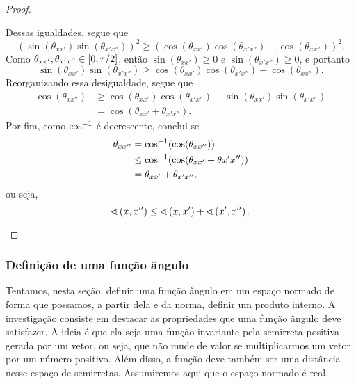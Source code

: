 \begin{proof}
\begin{enumerate}
	Dessas igualdades, segue que
		\begin{equation*}
		(\sin(\theta_{xx'}) \sin(\theta_{x'x''}))^2 \geq (\cos(\theta_{xx'})\cos(\theta_{x'x''}) - \cos(\theta_{xx''}))^2.
		\end{equation*}
	Como $\theta_{xx'}, \theta_{x'x''} \in \left[{0},{\tau/2}\right]$, então $\sin(\theta_{xx'}) \geq 0$ e $\sin(\theta_{x'x''}) \geq 0$, e portanto
		\begin{equation*}
		\sin(\theta_{xx'}) \sin(\theta_{x'x''}) \geq \cos(\theta_{xx'})\cos(\theta_{x'x''}) - \cos(\theta_{xx''}).
		\end{equation*}
	Reorganizando essa desigualdade, segue que
		\begin{align*}
		\cos(\theta_{xx''}) &\geq \cos(\theta_{xx'})\cos(\theta_{x'x''}) - \sin(\theta_{xx'}) \sin(\theta_{x'x''}) \\
			&= \cos(\theta_{xx'} + \theta_{x'x''}).
		\end{align*}
	Por fim, como $\cos^{-1}$ é decrescente, conclui-se
		\begin{align*}
		\theta_{xx''} &= \cos^{-1}(\cos(\theta_{xx''})) \\
			&\leq \cos^{-1}(\cos(\theta_{xx'} + \theta{x'x''})) \\
			&= \theta_{xx'} + \theta_{x'x''},
		\end{align*}
	ou seja,
		\begin{equation*}
		\sphericalangle\left({x},{x''}\right) \leq \sphericalangle\left({x},{x'}\right) + \sphericalangle\left({x'},{x''}\right).
		\qedhere
		\end{equation*}
	\end{enumerate}

\end{proof}



\subsubsection{Definição de uma função ângulo}

Tentamos, nesta seção, definir uma função ângulo em um espaço normado de forma que possamos, a partir dela e da norma, definir um produto interno. A investigação consiste em destacar as propriedades que uma função ângulo deve satisfazer. A ideia é que ela seja uma função invariante pela semirreta positiva gerada por um vetor, ou seja, que não mude de valor se multiplicarmos um vetor por um número positivo. Além disso, a função deve também ser uma distância nesse espaço de semirretas. Assumiremos aqui que o espaço normado é real.

